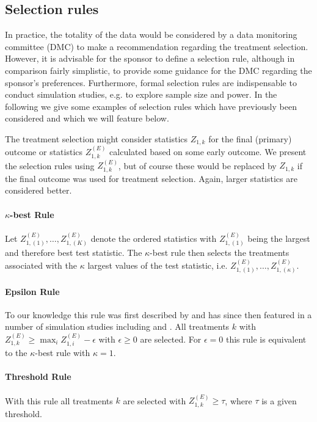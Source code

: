 \documentclass[bimj,fleqn]{w-art}
\theoremstyle{plain}
\theoremstyle{definition}
\begin{document}
\subsection{Selection rules}
\label{ssec:selection_rules}
In practice, the totality of the data would be considered by a data monitoring committee (DMC) to make a recommendation regarding the treatment selection. However, it is advisable for the sponsor to define a selection rule, although in comparison fairly simplistic, to provide some guidance for the DMC regarding the sponsor's preferences. Furthermore, formal selection rules are indispensable to conduct simulation studies, e.g. to explore sample size and power. In the following we give some examples of selection rules which have previously been considered and which we will feature below.

The treatment selection might consider statistics $Z_{1,k}$ for the final (primary) outcome or statistics $Z_{1,k}^{(E)}$ calculated based on some early outcome. We present the selection rules using $Z_{1,k}^{(E)}$, but of course these would be replaced by $Z_{1,k}$ if the final outcome was used for treatment selection. Again, larger statistics are considered better. 

\paragraph{$\kappa$-best Rule} Let $Z_{1,(1)}^{(E)}, \dots, Z_{1,(K)}^{(E)}$ denote the ordered statistics with $Z_{1,(1)}^{(E)}$ being the largest and therefore best test statistic. The $\kappa$-best rule then selects the treatments associated with the $\kappa$ largest values of the test statistic, %
i.e. $Z_{1,(1)}^{(E)}, \dots, Z_{1,(\kappa)}^{(E)}$.

\paragraph{Epsilon Rule} To our knowledge this rule was first described by \citet{kelly_adaptive_2005} and has since then featured in a number of simulation studies including \citet{friede_comparison_2008} and \citet{friede_adaptive_2020}. All treatments $k$ with $Z_{1,k}^{(E)} \ge \max_i Z_{1,i}^{(E)} - \epsilon$ with $\epsilon \ge 0$ are selected. For $\epsilon=0$ this rule is equivalent to the $\kappa$-best rule with $\kappa=1$. 

\paragraph{Threshold Rule} With this rule all treatments $k$ are selected with $Z_{1,k}^{(E)} \ge \tau$, where $\tau$ is a given threshold. \\
\end{document}
